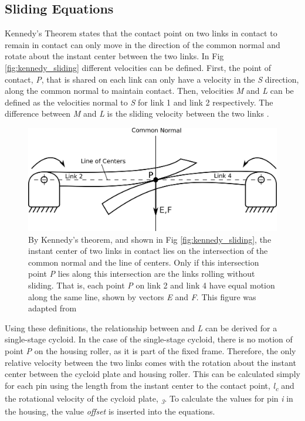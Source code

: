 \subsection{Sliding Equations} \label{ch:design:pin_roll_1s:sliding_equations}

Kennedy's Theorem states that the contact point on two links in contact to remain in contact can only move in the direction of the common normal and rotate about the instant center between the two links. In Fig \ref{fig:kennedy_sliding} different velocities can be defined. First, the point of contact, \textit{P}, that is shared on each link can only have a velocity in the \textit{S} direction, along the common normal to maintain contact. Then, velocities \textit{M} and \textit{L} can be defined as the velocities normal to \textit{S} for link 1 and link 2 respectively. The difference between \textit{M} and \textit{L} is the sliding velocity between the two links \cite{ref:kinematics_and_dynamics}.

\begin{figure}[!b]
   \centering
   \includegraphics[width=0.8\linewidth]{fig/kennedy_rolling}
   \caption{By Kennedy's theorem, and shown in Fig \ref{fig:kennedy_sliding}, the instant center of two links in contact lies on the intersection of the common normal and the line of centers. Only if this intersection point \textit{P} lies along this intersection are the links rolling without sliding. That is, each point \textit{P} on link 2 and link 4 have equal motion along the same line, shown by vectors \textit{E} and \textit{F}.
   This figure was adapted from \cite{ref:kinematics_and_dynamics}}
   \label{fig:kennedy_rolling}
\end{figure}

Using these definitions, the relationship between  and \textit{L} can be derived for a single-stage cycloid. In the case of the single-stage cycloid, there is no motion of point \textit{P} on the housing roller, as it is part of the fixed frame. Therefore, the only relative velocity between the two links comes with the rotation about the instant center between the cycloid plate and housing roller. This can be calculated simply for each pin using the length from the instant center to the contact point, \textit{l\textsubscript{c}} and the rotational velocity of the cycloid plate, \textit{\textomega\textsubscript{3}}. To calculate the values for pin \textit{i} in the housing, the value \textit{offset} is inserted into the equations.  

